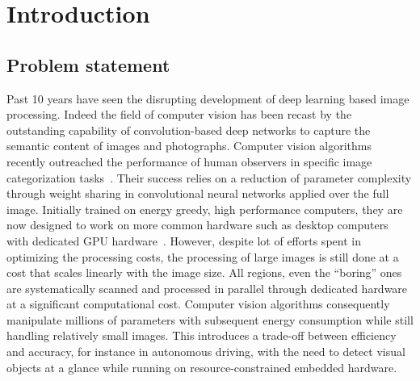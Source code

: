 \section*{Introduction}
\label{sec:intro}
\subsection*{Problem statement}


Past 10 years have seen the disrupting development of deep learning based image processing.
Indeed the field of computer vision has been recast by the outstanding capability of convolution-based deep networks to capture the semantic content of images and photographs. Computer vision algorithms recently outreached the performance of human observers in specific image categorization tasks~\cite{He15}. Their success relies on a reduction of parameter complexity through weight sharing  in convolutional neural networks applied over the full image.
Initially trained on energy greedy, high performance computers, they are now designed to work on more common hardware such as desktop computers with dedicated GPU hardware~\cite{Sandler18}.
However, despite lot of efforts spent in optimizing the processing costs, the processing of large images is still done at a cost that scales linearly with the image size. All regions, even the “boring” ones are systematically scanned and processed in parallel through dedicated hardware at a significant computational cost.
Computer vision algorithms consequently manipulate millions of parameters with subsequent energy consumption while still handling relatively small images. This introduces a trade-off between efficiency and accuracy, for instance in autonomous driving, with the need to detect visual objects at a glance while running on resource-constrained embedded hardware.

